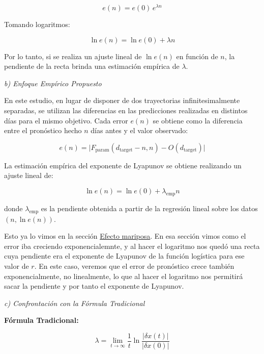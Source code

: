 \documentclass[
  10pt,
  a4paper,
  DIV=11,
  numbers=noendperiod,
  open=any]{scrreprt}
\numberwithin{equation}{chapter}
\numberwithin{equation}{section}
\renewcommand{\[}{\begin{equation}}
\renewcommand{\]}{\end{equation}}
\begin{document}
\begin{equation}
e(n) = e(0)\, e^{\lambda n}
\end{equation}

Tomando logaritmos:

\begin{equation}
\ln e(n) = \ln e(0) + \lambda n
\end{equation}

Por lo tanto, si se realiza un ajuste lineal de \(\ln e(n)\) en función
de \(n\), la pendiente de la recta brinda una estimación empírica de
\(\lambda\).

\emph{b) Enfoque Empírico Propuesto}

En este estudio, en lugar de disponer de dos trayectorias
infinitesimalmente separadas, se utilizan las diferencias en las
predicciones realizadas en distintos días para el mismo objetivo. Cada
error \(e(n)\) se obtiene como la diferencia entre el pronóstico hecho
\(n\) días antes y el valor observado:

\begin{equation}
e(n) = \bigl| F_{\text{param}}(d_{\text{target}}-n, n) - O(d_{\text{target}}) \bigr|
\end{equation}

La estimación empírica del exponente de Lyapunov se obtiene realizando
un ajuste lineal de:

\begin{equation}
\ln e(n) = \ln e(0) + \lambda_{\text{emp}} n
\end{equation}

donde \(\lambda_{\text{emp}}\) es la pendiente obtenida a partir de la
regresión lineal sobre los datos \((n, \ln e(n))\).

Esto ya lo vimos en la sección \hyperref[sec-sensibilidad]{Efecto
mariposa}. En esa sección vimos como el error iba creciendo
exponencialemnte, y al hacer el logaritmo nos quedó una recta cuya
pendiente era el exponente de Lyapunov de la función logística para ese
valor de \(r\). En este caso, veremos que el error de pronóstico crece
también exponencialmente, no linealmente, lo que al hacer el logaritmo
nos permitirá sacar la pendiente y por tanto el exponente de Lyapunov.

\emph{c) Confrontación con la Fórmula Tradicional}

\textbf{Fórmula Tradicional:}

\begin{equation}
\lambda = \lim_{t \to \infty} \frac{1}{t} \ln \frac{|\delta x(t)|}{|\delta x(0)|}
\end{equation}
\end{document}
